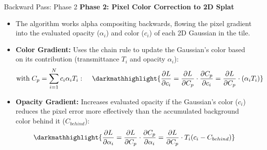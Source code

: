 \begin{frame}{Backward Pass: Phase 2}
    \textbf{Phase 2: Pixel Color Correction to 2D Splat}
    \begin{itemize}
        \justifying
        \item The algorithm works alpha compositing backwards, flowing the pixel gradient into the evaluated opacity ($\alpha_i$) and color ($c_i$) of each 2D Gaussian in the tile.
    \end{itemize}

    \vspace{0.5em}

    \begin{itemize}
        \justifying
        \item \textbf{Color Gradient:} Uses the chain rule to update the Gaussian's color based on its contribution (transmittance $T_i$ and opacity $\alpha_i$):
        $$ \text{with} \hspace{1mm} C_{p} = \sum_{i=1}^{N} c_i \alpha_i T_i: \hspace{4mm}
        \darkmathhighlight{
            \frac{\partial L}{\partial c_i} = 
            \frac{\partial L}{\partial C_p} \cdot \frac{\partial C_p}{\partial c_i} = 
            \frac{\partial L}{\partial C_p} \cdot (\alpha_i T_i)}  $$
    \end{itemize}

    \pause
    \vspace{0.5em}

    \begin{itemize}
        \justifying
        \item \textbf{Opacity Gradient:} Increases evaluated opacity if the Gaussian's color ($c_i$) reduces the pixel error more effectively than the accumulated background color behind it ($C_{behind}$):
        $$ \darkmathhighlight{
            \frac{\partial L}{\partial \alpha_i} = 
            \frac{\partial L}{\partial C_p} \cdot \frac{\partial C_p}{\partial \alpha_i} = 
            \frac{\partial L}{\partial C_p} \cdot T_i (c_i - C_{behind})} $$
    \end{itemize}


\end{frame}

